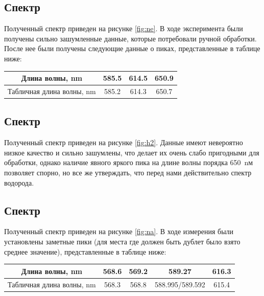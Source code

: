 \documentclass[a4paper, 12pt]{article}
\begin{document}
\subsection{Спектр }

Полученный спектр приведен на рисунке \ref{fig:ne}. В ходе эксперимента были получены сильно зашумленные данные, которые потребовали ручной обработки. После нее были получены следующие данные о пиках, представленные в таблице ниже:

\begin{center}
	\begin{tabular}{|c|c|c|c|}
		\hline
		Длина волны, nm & 585.5 & 614.5 & 650.9 \\
		\hline
		Табличная длина волны, nm & 585.2 & 614.3 & 650.7 \\
		\hline
	\end{tabular}
\end{center}





\subsection{Спектр }

Полученный спектр приведен на рисунке \ref{fig:h2}. Данные имеют невероятно низкое качество и сильно зашумлены, что делает их очень слабо пригодными для обработки, однако наличие явного яркого пика на длине волны порядка 650~nм позволяет спорно, но все же утверждать, что перед нами действительно спектр водорода.




\subsection{Спектр }

Полученный спектр приведен на рисунке \ref{fig:na}. В ходе измерения были установлены заметные пики (для места где должен быть дублет было взято среднее значение), представленные в таблице ниже:

\begin{center}
	\begin{tabular}{|c|c|c|c|c|}
		\hline
		Длина волны, nm & 568.6 & 569.2 & 589.27 & 616.3 \\
		\hline
		Табличная длина волны, nm & 568.3 & 568.8 & 588.995/589.592 & 615.4 \\
		\hline
	\end{tabular}
\end{center}
\end{document}
